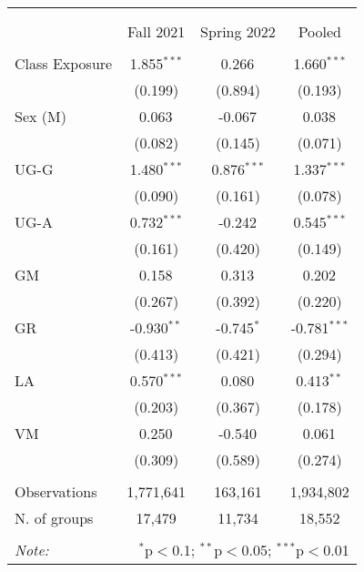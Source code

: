 

\begin{table}[!htbp] \centering
    \begin{tabular}{@{\extracolsep{5pt}}lccc}
    \\[-1.8ex]\hline
    \hline \\[-1.8ex]
    \\[-1.8ex] & \multicolumn{1}{c}{Fall 2021} & \multicolumn{1}{c}{Spring 2022} & \multicolumn{1}{c}{Pooled}  \\
    \hline \\[-1.8ex]
     Class Exposure & 1.855$^{***}$ & 0.266$^{}$ & 1.660$^{***}$ \\
    & (0.199) & (0.894) & (0.193) \\
     Sex (M) & 0.063$^{}$ & -0.067$^{}$ & 0.038$^{}$ \\
    & (0.082) & (0.145) & (0.071) \\
     UG-G & 1.480$^{***}$ & 0.876$^{***}$ & 1.337$^{***}$ \\
    & (0.090) & (0.161) & (0.078) \\
     UG-A & 0.732$^{***}$ & -0.242$^{}$ & 0.545$^{***}$ \\
    & (0.161) & (0.420) & (0.149) \\
     GM & 0.158$^{}$ & 0.313$^{}$ & 0.202$^{}$ \\
    & (0.267) & (0.392) & (0.220) \\
     GR & -0.930$^{**}$ & -0.745$^{*}$ & -0.781$^{***}$ \\
    & (0.413) & (0.421) & (0.294) \\
     LA & 0.570$^{***}$ & 0.080$^{}$ & 0.413$^{**}$ \\
    & (0.203) & (0.367) & (0.178) \\
     VM & 0.250$^{}$ & -0.540$^{}$ & 0.061$^{}$ \\
    & (0.309) & (0.589) & (0.274) \\
    \hline \\[-1.8ex]
     Observations & 1,771,641 & 163,161 & 1,934,802 \\
     N. of groups & 17,479 & 11,734 & 18,552 \\
    \hline
    \hline \\[-1.8ex]
    \textit{Note:} & \multicolumn{3}{r}{$^{*}$p$<$0.1; $^{**}$p$<$0.05; $^{***}$p$<$0.01} \\
    \end{tabular}
    \end{table}
    
